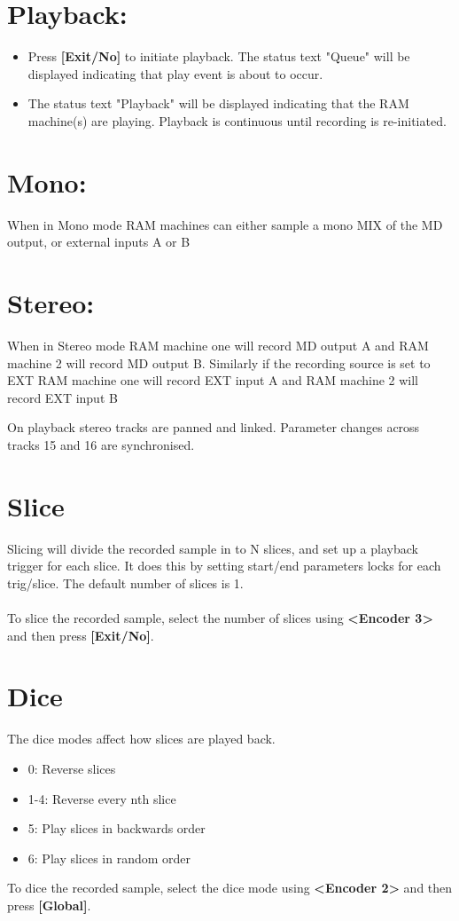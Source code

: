 \section{Playback:}
\begin{itemize}
\item Press \textbf{[Exit/No]} to initiate playback. The status text "Queue" will be displayed indicating that play event is about to occur. 
\item The status text "Playback" will be displayed indicating that the RAM machine(s) are playing. Playback is continuous until recording is re-initiated. 
\end{itemize}


\section{Mono:}
When in Mono mode RAM machines can either sample a mono MIX of the MD output, or external inputs A or B
\section{Stereo:}
When in Stereo mode RAM machine one will record MD output A and RAM machine 2 will record MD output B. Similarly if the recording source is set to EXT RAM machine one will record EXT input A and RAM machine 2 will record EXT input B

On playback stereo tracks are panned and linked. Parameter changes across tracks 15 and 16 are synchronised.
\newpage
\section{Slice}
Slicing will divide the recorded sample in to N slices, and set up a playback trigger for each slice. It does this by setting start/end parameters locks for each trig/slice. The default number of slices is 1.\\
\\
To slice the recorded sample, select the number of slices using \textbf{<Encoder 3>} and then press \textbf{[Exit/No]}.
\\

\section{Dice}

The dice modes affect how slices are played back.
\begin{itemize}
    \item 0: Reverse slices
    \item 1-4: Reverse every nth slice
    \item 5: Play slices in backwards order
    \item 6: Play slices in random order
\end{itemize}

To dice the recorded sample, select the dice mode using \textbf{<Encoder 2>} and then press \textbf{[Global]}.

